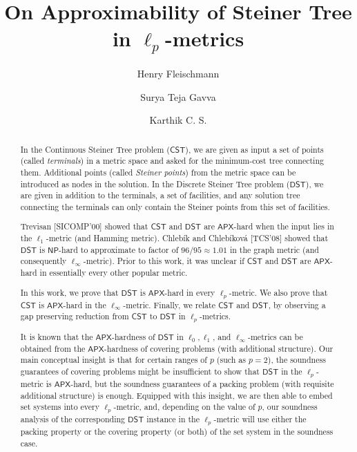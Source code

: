 \documentclass{article}\providecommand{\DeclareRedundantLanguages}[2]{}\usepackage[a4paper,margin=20mm]{geometry}
\title{On Approximability of Steiner Tree in \texorpdfstring{$\ell_p$}{lp}-metrics}
\author{Henry Fleischmann \and Surya Teja Gavva \and Karthik C. S.}\date{}
\newcommand{\1}{\textbf{1}}
\newcommand{\cst}{$\mathsf{CST}$\xspace}
\newcommand{\dst}{$\mathsf{DST}$\xspace}
\newcommand{\np}{$\mathsf{NP}$\xspace}
\newcommand{\apx}{$\mathsf{APX}$\xspace}
\begin{document}
\maketitle

\begin{abstract}
In the Continuous Steiner Tree problem (\cst), we are given as input a set of points (called \emph{terminals}) in a metric space and asked for the minimum-cost tree connecting them. Additional points (called \emph{Steiner points}) from the metric space can be introduced as nodes in the solution. In the Discrete Steiner Tree problem (\dst), we are given in addition to the terminals, a set of facilities, and any solution tree connecting the terminals can only contain the Steiner points from this set of facilities. %

Trevisan [SICOMP'00] showed that \cst and \dst are \apx-hard when the input lies in the $\ell_1$-metric (and Hamming metric). Chleb\'ik and Chleb\'ikov\'a [TCS'08] showed that \dst is \np-hard to approximate to factor of $96/95\approx 1.01$ in the graph metric (and consequently $\ell_\infty$-metric). Prior to this work, it was unclear if \cst and \dst are \apx-hard in essentially every other popular metric. %

In this work, we prove that \dst is \apx-hard in every $\ell_p$-metric. We also prove that \cst is \apx-hard in the $\ell_{\infty}$-metric. Finally, we relate \cst and \dst, by observing a gap preserving reduction from \cst to \dst in $\ell_p$-metrics. 


 
 It is known that the \apx-hardness of \dst in $\ell_0,\ell_1$, and $\ell_\infty$-metrics  can be obtained from the {\apx-hardness} of covering problems (with additional structure). 
Our main conceptual insight is that for certain ranges of $p$ (such as $p=2$), the soundness guarantees of covering problems might be insufficient to show that  \dst in the $\ell_p$-metric is \apx-hard, but the soundness guarantees of a packing problem (with requisite additional structure) is enough. Equipped with this insight, we are then able to embed set systems into every $\ell_p$-metric, and, depending on the value of $p$, our soundness analysis of the corresponding \dst instance in the $\ell_p$-metric will use either the packing property or the covering property (or both) of the set system in the soundness case.  %



\end{abstract}
\end{document}
